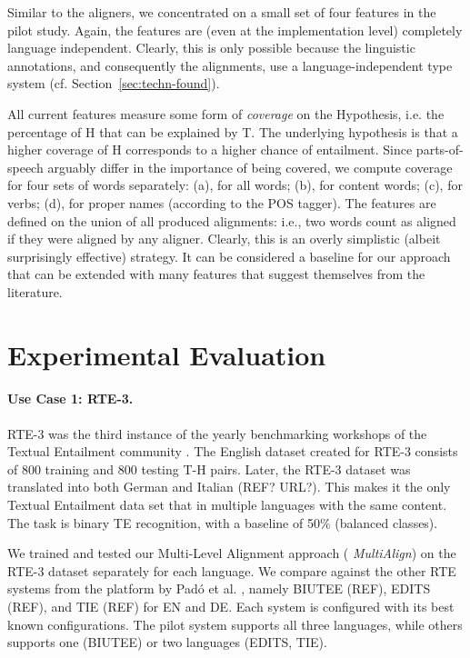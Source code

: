 \documentclass[11pt,letterpaper]{article}
\begin{document}
Similar to the aligners, we concentrated on a small set of four
features in the pilot study. Again, the features are (even at the
implementation level) completely language independent. Clearly, this
is only possible because the linguistic annotations, and consequently
the alignments, use a language-independent type system
(cf. Section~\ref{sec:techn-found}).

All current features measure some form of \textit{coverage} on the
Hypothesis, i.e. the percentage of H that can be explained by T. The
underlying hypothesis is that a higher coverage of H corresponds to a
higher chance of entailment. Since parts-of-speech arguably differ in
the importance of being covered, we compute coverage for four sets of
words separately: (a), for all words; (b), for content words; (c), for
verbs; (d), for proper names (according to the POS tagger). The
features are defined on the union of all produced alignments: i.e.,
two words count as aligned if they were aligned by any aligner. 
Clearly, this is an overly simplistic (albeit surprisingly effective)
strategy. It can be considered a baseline for our approach that can be
extended with many features that suggest themselves from the
literature. 

\section{Experimental Evaluation} 
 
\paragraph{Use Case 1: RTE-3.}
RTE-3 was the third instance of the yearly benchmarking workshops of
the Textual Entailment community
\cite{giampiccolo07:_third_pascal_recog_textual_entail_chall}. The
English dataset created for RTE-3 consists of 800 training and 800
testing T-H pairs. Later, the RTE-3 dataset was translated into both
German and Italian (REF? URL?). This makes it the only Textual
Entailment data set that in multiple languages with the same
content. The task is binary TE recognition, with a baseline of 50\%
(balanced classes).

We trained and tested our Multi-Level Alignment approach ({\em
  MultiAlign}) on the RTE-3 dataset separately for each language. We
compare against the other RTE systems from the platform by Pad\'o et
al. , namely BIUTEE (REF), EDITS (REF), and TIE
(REF) for EN and DE. Each system is configured with its best known
configurations. The pilot system supports all three languages, while
others supports one (BIUTEE) or two languages (EDITS, TIE). 
\end{document}
